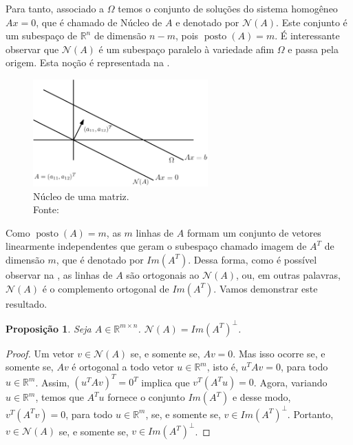 \documentclass[12pt,a4paper]{scrartcl}
\DeclareMathOperator{\posto}{posto}
\def\RR{\mathds{R}}
\newtheorem{prop}{Proposição}
\theoremstyle{definition}%
\begin{document}
Para tanto, associado a $\Omega$ temos o conjunto de soluções do sistema homogêneo $Ax=0$, que é chamado de Núcleo de $A$ e denotado por $\mathcal{N}(A)$. Este conjunto é um subespaço de $\RR^{n}$ de dimensão $n-m$, pois $\posto (A)=m$. É interessante observar que $\mathcal{N}(A)$ é um subespaço paralelo à variedade afim $\Omega$ e passa pela origem. Esta noção é representada na .

\begin{figure}[!ht] 
	\centering
	\includegraphics[width=0.60\textwidth]{nucleoA_paralelo_Omega}
	\caption{ Núcleo de uma matriz. \\ Fonte: \textcite{Ana1994} \label{fig:nucleoA_paralelo_Omega}}
\end{figure}


Como $\posto (A)=m$, as $m$ linhas de $A$ formam um conjunto de vetores linearmente independentes que geram o subespaço chamado imagem de $A^{T}$ de dimensão $m$, que é denotado por $Im(A^{T})$. Dessa forma, como é possível observar na , as linhas de $A$ são ortogonais ao $\mathcal{N}(A)$, ou, em outras palavras, $\mathcal{N}(A)$ é o complemento ortogonal de $Im(A^{T})$. Vamos demonstrar este resultado. 

\begin{prop} \label{prop:complemento_ortogonal_nucleo}
Seja $A \in \RR^{m\times n}$. $\mathcal{N}(A) = Im(A^{T})^{\bot}$.
\end{prop}
\begin{proof}
Um vetor $v \in \mathcal{N}(A)$ se, e somente se, $Av=0$. Mas isso ocorre se, e somente se, $Av$ é ortogonal a todo vetor $u\in \RR^{m}$, isto é, $u^{T}Av=0$, para todo $u \in \RR^{m}$. Assim, $(u^{T}Av)^{T} = 0^{T}$ implica que $v^{T}(A^{T}u) = 0$. Agora, variando $u \in \RR^{m}$, temos que $A^{T}u$ fornece o conjunto $Im(A^{T})$ e desse modo, $v^{T}(A^{T}v) = 0$, para todo $u \in \RR^{m}$, se, e somente se, $v \in Im(A^{T})^{\bot}$. Portanto, $v\in \mathcal{N}(A)$ se, e somente se, $v\in Im(A^{T})^{\bot}$.
\end{proof}
\end{document}
